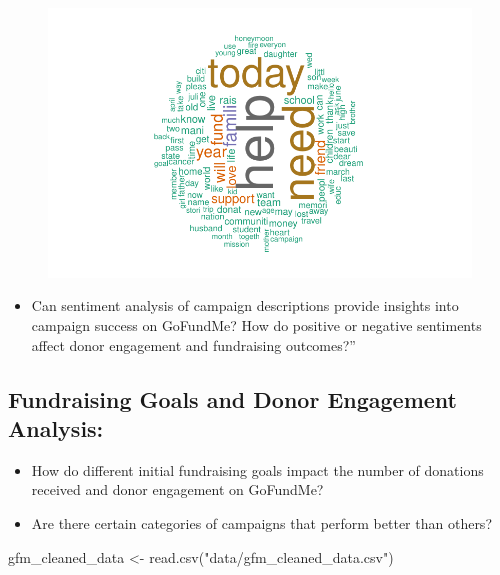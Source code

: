 \documentclass[
  letterpaper,
  DIV=11,
  numbers=noendperiod]{scrartcl}
\newenvironment{Shaded}{\begin{snugshade}}{\end{snugshade}}
\newcommand{\FunctionTok}[1]{\textcolor[rgb]{0.28,0.35,0.67}{#1}}
\newcommand{\NormalTok}[1]{\textcolor[rgb]{0.00,0.23,0.31}{#1}}
\newcommand{\OtherTok}[1]{\textcolor[rgb]{0.00,0.23,0.31}{#1}}
\newcommand{\StringTok}[1]{\textcolor[rgb]{0.13,0.47,0.30}{#1}}
\providecommand{\tightlist}{%
  \setlength{\itemsep}{0pt}\setlength{\parskip}{0pt}}\usepackage{longtable,booktabs,array}
\begin{document}
\begin{figure}[H]

{\centering \includegraphics{gfm_data_analysis_files/figure-pdf/unnamed-chunk-12-1.pdf}

}

\end{figure}

\begin{itemize}
\tightlist
\item
  Can sentiment analysis of campaign descriptions provide insights into
  campaign success on GoFundMe? How do positive or negative sentiments
  affect donor engagement and fundraising outcomes?''
\end{itemize}

\hypertarget{fundraising-goals-and-donor-engagement-analysis}{%
\subsection{Fundraising Goals and Donor Engagement
Analysis:}\label{fundraising-goals-and-donor-engagement-analysis}}

\begin{itemize}
\item
  How do different initial fundraising goals impact the number of
  donations received and donor engagement on GoFundMe?
\item
  Are there certain categories of campaigns that perform better than
  others?
\end{itemize}

\begin{Shaded}
\begin{Highlighting}[]
\NormalTok{gfm\_cleaned\_data }\OtherTok{\textless{}{-}} \FunctionTok{read.csv}\NormalTok{(}\StringTok{"data/gfm\_cleaned\_data.csv"}\NormalTok{)}
\end{Highlighting}
\end{Shaded}
\end{document}

